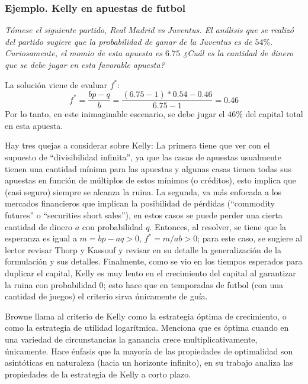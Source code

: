\subsubsection{Ejemplo. Kelly en apuestas de futbol}

\emph{Tómese el siguiente partido, Real Madrid vs Juventus. El análisis que se realizó del partido sugiere que la probabilidad de ganar de la Juventus es de $54\%$. Curiosamente, el momio de esta apuesta es $6.75$
¿Cuál es la cantidad de dinero que se debe jugar en esta favorable apuesta?}\linebreak[2]


La solución viene de evaluar $f^*$:
\[f^* = \frac{bp -q}{b} = \frac{(6.75-1)*0.54 - 0.46}{6.75-1} = 0.46\]
Por lo tanto, en este inimaginable escenario, se debe jugar el $46\%$ del capital total en esta apuesta.
\linebreak[2]



Hay tres quejas a considerar sobre Kelly: La primera tiene que ver con el supuesto de ``divisibilidad infinita'', ya que las casas de apuestas usualmente tienen una cantidad mínima para las apuestas y algunas casas tienen todas sus apuestas en función de múltiplos de estos mínimos (o créditos), esto implica que  (casi seguro) siempre se alcanza la ruina. La segunda, va más enfocada a los mercados financieros que implican la posibilidad de pérdidas (``commodity futures'' o ``securities short sales''), en estos casos se puede perder una cierta cantidad de dinero $a$ con probabilidad $q$. Entonces, al resolver, se tiene que la esperanza es igual a $m=bp-aq>0$, $f^*=m/ab >0$; para este caso, se sugiere al lector revisar Thorp y Kassouf \cite{thorp1967beat} y revisar en su detalle la generalización de la formulación y sus detalles. Finalmente, como se vio en los tiempos esperados para duplicar el capital, Kelly es muy lento en el crecimiento del capital al garantizar la ruina con probabilidad $0$; esto hace que en temporadas de futbol (con una cantidad de juegos) el criterio sirva únicamente de guía.

Browne \cite{browne2000can} llama al criterio de Kelly \cite{kelly1956new} como la estrategia óptima de crecimiento, o como la estrategia de utilidad logarítmica. Menciona que es óptima cuando en una variedad de circunstancias la ganancia crece multiplicativamente, únicamente. Hace énfasis que la mayoría de las propiedades de optimalidad son asintóticas en naturaleza (hacia un horizonte infinito), en su trabajo analiza las propiedades de la estrategia de Kelly a corto plazo.


